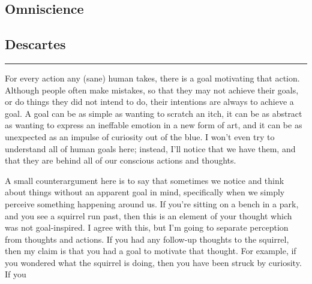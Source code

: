 \documentclass[11pt, oneside]{article}   	%
\newcommand\hr{\bigskip\hrule\bigskip}
\begin{document}
\subsection{Omniscience}

\subsection{Descartes}


\hr

For every action any (sane) human takes, there is a goal motivating that action.
Although people often make mistakes, so that they may not achieve their goals,
or do things they did not intend to do, their intentions are always to achieve a
goal. A goal can be as simple as wanting to scratch an itch, it can be as
abstract as wanting to express an ineffable emotion in a new form of art, and it
can be as unexpected as an impulse of curiosity out of the blue. I won't even
try to understand all of human goals here; instead, I'll notice that we have
them, and that they are behind all of our conscious actions and thoughts.

A small counterargument here is to say that sometimes we notice and think about
things without an apparent goal in mind, specifically when we simply perceive
something happening around us. If you're sitting on a bench in a park, and you
see a squirrel run past, then this is an element of your thought which was not
goal-inspired. I agree with this, but I'm going to separate perception from
thoughts and actions. If you had any follow-up thoughts to the squirrel, then my
claim is that you had a goal to motivate that thought. For example, if you
wondered what the squirrel is doing, then you have been struck by curiosity. If
you 



%

\end{document}
